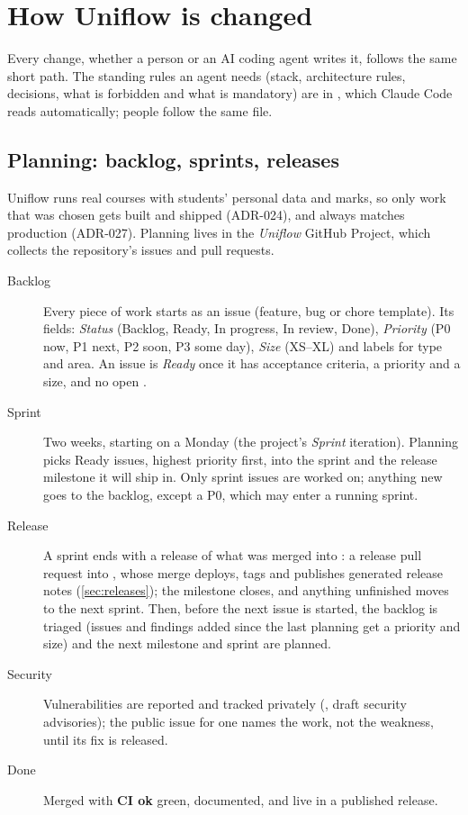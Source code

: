 \chapter{How Uniflow is changed}\label{ch:changes}

Every change, whether a person or an AI coding agent writes it, follows the same short path. The
standing rules an agent needs (stack, architecture rules, decisions, what is forbidden and what is
mandatory) are in , which Claude Code reads automatically; people follow the same
file.

\section{Planning: backlog, sprints, releases}\label{sec:planning}
Uniflow runs real courses with students' personal data and marks, so only work that was chosen gets
built and shipped (ADR-024), and  always matches production (ADR-027). Planning lives in the \emph{Uniflow} GitHub Project, which collects
the repository's issues and pull requests.
\begin{description}
  \item[Backlog] Every piece of work starts as an issue (feature, bug or chore template). Its
    fields: \emph{Status} (Backlog, Ready, In progress, In review, Done), \emph{Priority} (P0 now,
    P1 next, P2 soon, P3 some day), \emph{Size} (XS--XL) and labels for type and area. An issue is
    \emph{Ready} once it has acceptance criteria, a priority and a size, and no open
    .
  \item[Sprint] Two weeks, starting on a Monday (the project's \emph{Sprint} iteration). Planning
    picks Ready issues, highest priority first, into the sprint and the release milestone it will
    ship in. Only sprint issues are worked on; anything new goes to the backlog, except a P0, which
    may enter a running sprint.
  \item[Release] A sprint ends with a release of what was merged into : a release pull
    request into , whose merge deploys, tags and publishes generated release notes
    (\cref{sec:releases}); the milestone closes, and anything unfinished moves to the next
    sprint. Then, before the next issue is started, the backlog is triaged (issues and findings
    added since the last planning get a priority and size) and the next milestone and sprint are
    planned.
  \item[Security] Vulnerabilities are reported and tracked privately (, draft
    security advisories); the public issue for one names the work, not the weakness, until its
    fix is released.
  \item[Done] Merged with \textbf{CI ok} green, documented, and live in a published release.
\end{description}


